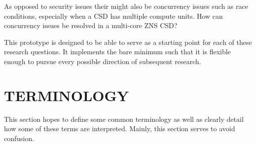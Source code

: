 \documentclass[conference]{IEEEtran}
\newcommand\bashstyle{
	\lstset{
		language=Bash,
		basicstyle=\ttm,
		showstringspaces=false,
		tabsize=2,
		aboveskip=0.2cm,
		belowskip=0.2cm,
		prebreak=\textbackslash,
		extendedchars=true,
		mathescape=false,
		linewidth=8.85cm,
		breaklines=true
	}
}
\newcommand\bashexternal[2][]{{\bashstyle}}
\newcommand\cstyle{
	\lstset{
		language=c,
		basicstyle=\ttm,
		showstringspaces=false,
		tabsize=4,
		aboveskip=0.2cm,
		belowskip=0.2cm,
		otherkeywords={self},             %
		keywordstyle=\ttb\color{deepblue},
		emph={MyClass,__init__},          %
		emphstyle=\ttb\color{deepred},    %
		stringstyle=\color{deepgreen},
		frame=tb,                          %
		prebreak=\textbackslash,
		linewidth=8.85cm,
		breaklines=true,
	}
}
\newcommand\cexternal[2][]{{\cstyle}}
\begin{document}
As opposed to security issues their might also be concurrency issues such as
race conditions, especially when a CSD has multiple compute units. How can
concurrency issues be resolved in a multi-core ZNS CSD?

This prototype is designed to be able to serve as a starting point for each
of these research questions. It implements the bare minimum such that it is
flexible enough to pursue every possible direction of subsequent research.

%



\section*{TERMINOLOGY} \label{term}

This section hopes to define some common terminology as well as clearly detail
how some of these terms are interpreted. Mainly, this section serves to avoid
confusion.

%
\end{document}
